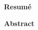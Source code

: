 
\begin{center}
    \bf{} Resumé
\end{center}
\lipsum[1]


\begin{center}
    \bf{} Abstract
\end{center}
\lipsum[1]

